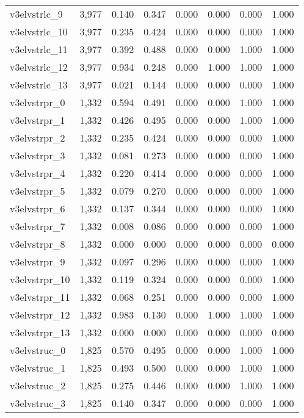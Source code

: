 \begin{table}[!htbp]
\begin{tabular}{@{\extracolsep{5pt}}lccccccc}
v3elvstrlc\_9 & 3,977 & 0.140 & 0.347 & 0.000 & 0.000 & 0.000 & 1.000 \\ 
v3elvstrlc\_10 & 3,977 & 0.235 & 0.424 & 0.000 & 0.000 & 0.000 & 1.000 \\ 
v3elvstrlc\_11 & 3,977 & 0.392 & 0.488 & 0.000 & 0.000 & 1.000 & 1.000 \\ 
v3elvstrlc\_12 & 3,977 & 0.934 & 0.248 & 0.000 & 1.000 & 1.000 & 1.000 \\ 
v3elvstrlc\_13 & 3,977 & 0.021 & 0.144 & 0.000 & 0.000 & 0.000 & 1.000 \\ 
v3elvstrpr\_0 & 1,332 & 0.594 & 0.491 & 0.000 & 0.000 & 1.000 & 1.000 \\ 
v3elvstrpr\_1 & 1,332 & 0.426 & 0.495 & 0.000 & 0.000 & 1.000 & 1.000 \\ 
v3elvstrpr\_2 & 1,332 & 0.235 & 0.424 & 0.000 & 0.000 & 0.000 & 1.000 \\ 
v3elvstrpr\_3 & 1,332 & 0.081 & 0.273 & 0.000 & 0.000 & 0.000 & 1.000 \\ 
v3elvstrpr\_4 & 1,332 & 0.220 & 0.414 & 0.000 & 0.000 & 0.000 & 1.000 \\ 
v3elvstrpr\_5 & 1,332 & 0.079 & 0.270 & 0.000 & 0.000 & 0.000 & 1.000 \\ 
v3elvstrpr\_6 & 1,332 & 0.137 & 0.344 & 0.000 & 0.000 & 0.000 & 1.000 \\ 
v3elvstrpr\_7 & 1,332 & 0.008 & 0.086 & 0.000 & 0.000 & 0.000 & 1.000 \\ 
v3elvstrpr\_8 & 1,332 & 0.000 & 0.000 & 0.000 & 0.000 & 0.000 & 0.000 \\ 
v3elvstrpr\_9 & 1,332 & 0.097 & 0.296 & 0.000 & 0.000 & 0.000 & 1.000 \\ 
v3elvstrpr\_10 & 1,332 & 0.119 & 0.324 & 0.000 & 0.000 & 0.000 & 1.000 \\ 
v3elvstrpr\_11 & 1,332 & 0.068 & 0.251 & 0.000 & 0.000 & 0.000 & 1.000 \\ 
v3elvstrpr\_12 & 1,332 & 0.983 & 0.130 & 0.000 & 1.000 & 1.000 & 1.000 \\ 
v3elvstrpr\_13 & 1,332 & 0.000 & 0.000 & 0.000 & 0.000 & 0.000 & 0.000 \\ 
v3elvstruc\_0 & 1,825 & 0.570 & 0.495 & 0.000 & 0.000 & 1.000 & 1.000 \\ 
v3elvstruc\_1 & 1,825 & 0.493 & 0.500 & 0.000 & 0.000 & 1.000 & 1.000 \\ 
v3elvstruc\_2 & 1,825 & 0.275 & 0.446 & 0.000 & 0.000 & 1.000 & 1.000 \\ 
v3elvstruc\_3 & 1,825 & 0.140 & 0.347 & 0.000 & 0.000 & 0.000 & 1.000 \\ 

\end{tabular}
\end{table}
